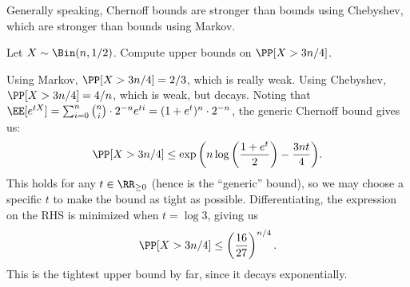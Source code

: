 Generally speaking, Chernoff bounds are stronger than bounds using Chebyshev, which are stronger than bounds using Markov. 

\begin{example}
\exlabel

Let $X\sim \Bin(n, 1/2)$. Compute upper bounds on $\PP[X > 3n/4]$.
\end{example}

Using Markov, $\PP[X > 3n/4] = 2/3$, which is really weak. Using Chebyshev, $\PP[X > 3n/4] = 4/n$, which is weak, but decays. Noting that $\EE[e^{tX}] = \sum_{i=0}^n \binom{n}{i}\cdot 2^{-n}e^{ti} = (1+e^t)^n\cdot 2^{-n}$, the generic Chernoff bound gives us:
\[\PP[X > 3n/4] \leq \exp{\left(n\log\left({\frac{1+e^t}{2}}\right) - \frac{3nt}{4}\right)}.\]
This holds for any $t\in \RR_{\geq 0}$ (hence is the ``generic'' bound), so we may choose a specific $t$ to make the bound as tight as possible. Differentiating, the expression on the RHS is minimized when $t=\log{3}$, giving us
\[\PP[X > 3n/4]\leq \left(\frac{16}{27}\right)^{n/4}.\]
This is the tightest upper bound by far, since it decays exponentially.
